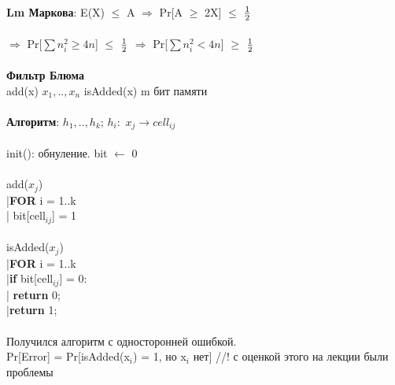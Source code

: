 \textbf{Lm Маркова}: E(X) $\le$ A $\Rightarrow$ Pr[A $\ge$ 2X] $\le$ $1\over{2}$\\\\
$\Rightarrow$ Pr[$\sum n_i^2 \ge 4n$] $\le$ $1\over{2}$ $\Rightarrow$ Pr[$\sum n_i^2 < 4n$] $\ge$ $1\over{2}$\\\\
\textbf{Фильтр Блюма}\\
add(x) $x_1,..,x_n$
isAdded(x) m бит памяти \\\\
\textbf{Алгоритм}: $h_1,..,h_k$; $h_i:$ $x_j \rightarrow cell_{ij}$\\\\
init(): обнуление. bit $\leftarrow$ 0\\\\
add($x_j$)\\
 |\textbf{FOR} i = 1..k\\
 |   bit[cell$_{ij}$] = 1\\\\
isAdded($x_j$)\\
 |\textbf{FOR} i = 1..k\\
 |\textbf{if} bit[cell$_{ij}$] = 0:\\
 |	 	 \textbf{return} 0;\\
 |\textbf{return} 1;\\\\
Получился алгоритм с односторонней ошибкой.\\
Pr[Error] = Pr[isAdded(x$_i$) = 1, но x$_i$ нет] //! с оценкой этого на лекции были проблемы 
 